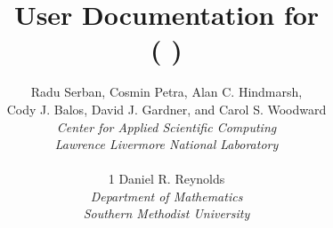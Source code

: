 \documentclass[twoside,openright,10pt]{report}
\title{User Documentation for {\idas} {\idasrelease} \\
           ({\sundials} {\sunrelease})}
\author{
  Radu Serban, Cosmin Petra, Alan C. Hindmarsh, \\
  Cody J. Balos, David J. Gardner, and Carol S. Woodward \\
  {\em Center for Applied Scientific Computing} \\
  {\em Lawrence Livermore National Laboratory} \\
  \\1
  Daniel R. Reynolds\\
  {\em Department of Mathematics} \\
  {\em Southern Methodist University}
}
\date{
  \today
  \vfill
  {\centerline{\texttt{[image: doc\_logo\_blue]}}}
  \vfill \idaucrlug
}
\begin{document}
\frontug
\renewcommand{\chaptermark}[1]{\markboth{#1}{}}
\renewcommand{\sectionmark}[1]{\markright{\thesection\ #1}}


\clearemptydoublepage

\clearemptydoublepage

\clearemptydoublepage

\clearemptydoublepage

\clearemptydoublepage

\clearemptydoublepage

\clearemptydoublepage

\clearemptydoublepage

\clearemptydoublepage

\clearemptydoublepage

\clearemptydoublepage

\clearemptydoublepage

\clearemptydoublepage
\appendix

\clearemptydoublepage

\clearemptydoublepage

\clearemptydoublepage


\clearemptydoublepage
\printindex
\clearemptydoublepage
\end{document}
